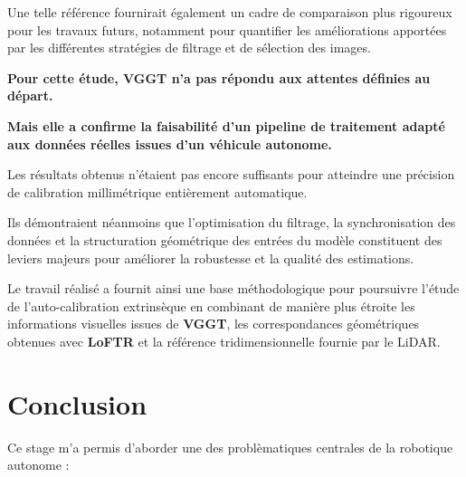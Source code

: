 \documentclass[12pt,a4paper,oneside]{report}
\begin{document}
\hspace*{0.5cm}Une telle référence fournirait également un cadre de comparaison plus rigoureux pour les travaux futurs, notamment pour quantifier les améliorations apportées par les différentes stratégies de filtrage et de sélection des images.

\newpage

\vspace{1cm}

\hspace*{1cm}\textbf{Pour cette étude, VGGT n'a pas répondu aux attentes définies au départ.}\vspace{0.05cm}

\hspace*{1cm}\textbf{Mais elle a confirme la faisabilité d'un pipeline de traitement adapté aux données réelles issues d'un véhicule autonome.}\vspace{1cm}

\hspace*{1cm}Les résultats obtenus n'étaient pas encore suffisants pour atteindre une précision de calibration millimétrique entièrement automatique. \vspace{0.01cm}

\hspace*{0.5cm}Ils démontraient néanmoins que l'optimisation du filtrage, la synchronisation des données et la structuration géométrique des entrées du modèle constituent des leviers majeurs pour améliorer la robustesse et la qualité des estimations.\vspace{0.5cm}

\hspace*{1cm}Le travail réalisé a fournit ainsi une base méthodologique pour poursuivre l'étude de l'auto-calibration extrinsèque en combinant de manière plus étroite les informations visuelles issues de \textbf{VGGT}, les correspondances géométriques obtenues avec \textbf{LoFTR} et la référence tridimensionnelle fournie par le LiDAR.


\chapter*{Conclusion}

\hspace*{1cm}Ce stage m'a permis d'aborder une des problèmatiques centrales de la robotique autonome :\vspace{0.01cm}
\end{document}
